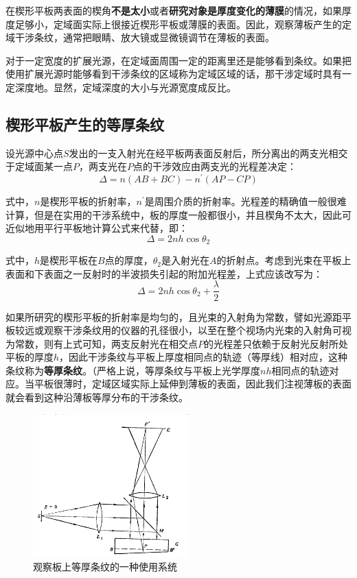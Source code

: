 \documentclass[UTF8]{ctexart}
\begin{document}
	在楔形平板两表面的楔角\textbf{不是太小}或者\textbf{研究对象是厚度变化的薄膜}的情况，如果厚度足够小，定域面实际上很接近楔形平板或薄膜的表面。因此，观察薄板产生的定域干涉条纹，通常把眼睛、放大镜或显微镜调节在薄板的表面。
	
	对于一定宽度的扩展光源，在定域面周围一定的距离里还是能够看到条纹。如果把使用扩展光源时能够看到干涉条纹的区域称为定域区域的话，那干涉定域时具有一定深度地。显然，定域深度的大小与光源宽度成反比。
	
	\subsection{楔形平板产生的等厚条纹}
	设光源中心点$ S $发出的一支入射光在经平板两表面反射后，所分离出的两支光相交于定域面某一点$ P $，两支光在$ P $点的干涉效应由两支光的光程差决定：
	\begin{equation}
		\Delta=n(AB+BC)-n^{\prime}(AP-CP)
	\end{equation}
	
\noindent 式中，$ n $是楔形平板的折射率，$ n^{\prime} $是周围介质的折射率。光程差的精确值一般很难计算，但是在实用的干涉系统中，板的厚度一般都很小，并且楔角不太大，因此可近似地用平行平板地计算公式来代替，即：
\begin{equation}
	\Delta=2n h \cos \theta_{2}
\end{equation}

\noindent 	式中，$ h $是楔形平板在$ B $点的厚度，$ \theta_{2} $是入射光在$ A $的折射点。考虑到光束在平板上表面和下表面之一反射时的半波损失引起的附加光程差，上式应该改写为：
\begin{equation}
	\Delta=2n h \cos \theta_{2}+\frac{\lambda}{2}
\end{equation}

\noindent 如果所研究的楔形平板的折射率是均匀的，且光束的入射角为常数，譬如光源距平板较远或观察干涉条纹用的仪器的孔径很小，以至在整个视场内光束的入射角可视为常数，则有上式可知，两支反射光在相交点$ P $的光程差只依赖于反射光反射所处平板的厚度$ h $，因此干涉条纹与平板上厚度相同点的轨迹（等厚线）相对应，这种条纹称为\textbf{等厚条纹}。（严格上说，等厚条纹与平板上光学厚度$ nh $相同点的轨迹对应。当平板很薄时，定域区域实际上延伸到薄板的表面，因此我们注视薄板的表面就会看到这种沿薄板等厚分布的干涉条纹。

\begin{figure}
	\includegraphics[width=6cm]{xie_practical.png}
	\caption{观察板上等厚条纹的一种使用系统}
	\label{figure_xie_practical}
\end{figure}
\end{document}
